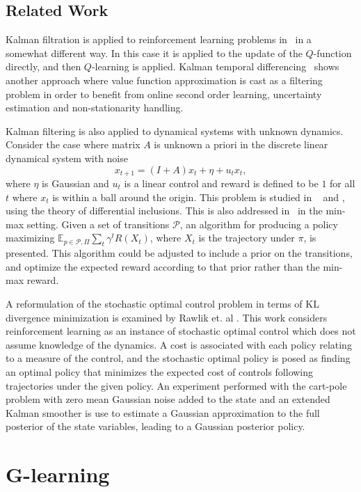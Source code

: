\documentclass{article}
\begin{document}
\subsection{Related Work}
Kalman filtration is applied to reinforcement learning problems in~\cite{trippSchacter} in a somewhat different way. In this case it  is applied to the update of the $Q$-function directly, and then $Q$-learning is applied. Kalman temporal differencing~\cite{geist2010kalman} shows another approach where value function approximation is cast as a filtering problem in order to benefit from online second order learning, uncertainty estimation and non-stationarity handling. 

Kalman filtering is also applied to dynamical systems with unknown dynamics. Consider the case where matrix $A$ is unknown a priori in the discrete linear dynamical system with noise
\[
    x_{t+1} = (I + A) x_t + \eta +  u_t x_t,
\]
where $\eta$ is Gaussian and $u_t$ is a linear control and reward is defined to be $1$ for all $t$ where $x_t$ is within a ball around the origin. This problem is studied in ~\cite{ornikIsraelTopcu} and \cite{ahmadiIsraelTopcu}, using the theory of differential inclusions. This is also addressed in~\cite{bagnell2004policy} in the min-max setting. Given a set of transitions $\mathcal P$, an algorithm for producing a policy maximizing $\mathbb E_{p \in \mathcal P, \Pi} \sum\limits_t \gamma^t R(X_t)$, where $X_t$ is the trajectory under $\pi$, is presented. This algorithm could be adjusted to include a prior on the transitions, and optimize the expected reward according to that prior rather than the min-max reward. 

A reformulation of the stochastic optimal control problem in terms of KL divergence minimization is examined by Rawlik et. al \cite{rawlik2013stochastic}. This work considers reinforcement learning as an instance of stochastic optimal control which does not assume knowledge of the dynamics.  A cost is associated with each policy relating to a measure of the control, and the stochastic optimal policy is posed as finding an optimal policy that minimizes the expected cost of controls following trajectories under the given policy. An experiment performed with the cart-pole problem with zero mean Gaussian noise added to the state and an extended Kalman smoother \cite{stengel1986stochastic} is use to estimate a Gaussian approximation to the full posterior of the state variables, leading to a Gaussian posterior policy.


\section{G-learning}
\end{document}
